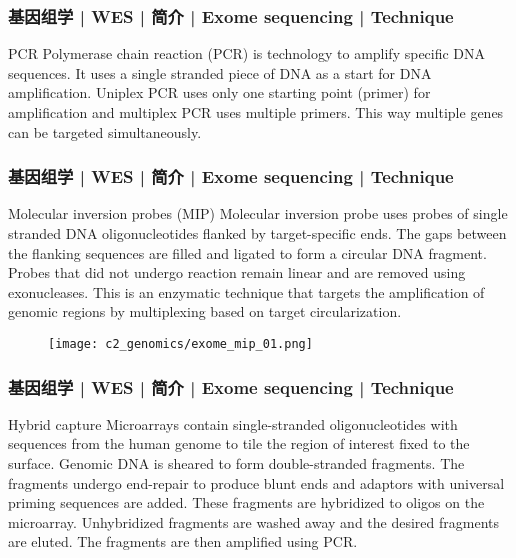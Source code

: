 \begin{frame}
  \frametitle{基因组学 | WES | 简介 | Exome sequencing | Technique}
  \begin{block}{PCR}
    Polymerase chain reaction (PCR) is technology to amplify specific DNA sequences. It uses a single stranded piece of DNA as a start for DNA amplification. Uniplex PCR uses only one starting point (primer) for amplification and multiplex PCR uses multiple primers. This way multiple genes can be targeted simultaneously.
  \end{block}
\end{frame}

\begin{frame}
  \frametitle{基因组学 | WES | 简介 | Exome sequencing | Technique}
  \begin{block}{Molecular inversion probes (MIP)}
    Molecular inversion probe uses probes of single stranded DNA oligonucleotides flanked by target-specific ends. The gaps between the flanking sequences are filled and ligated to form a circular DNA fragment. Probes that did not undergo reaction remain linear and are removed using exonucleases. This is an enzymatic technique that targets the amplification of genomic regions by multiplexing based on target circularization.
  \end{block}
  \begin{figure}
    \centering
    \texttt{[image: c2\_genomics/exome\_mip\_01.png]}
  \end{figure}
\end{frame}

\begin{frame}
  \frametitle{基因组学 | WES | 简介 | Exome sequencing | Technique}
  \begin{block}{Hybrid capture}
    Microarrays contain single-stranded oligonucleotides with sequences from the human genome to tile the region of interest fixed to the surface. Genomic DNA is sheared to form double-stranded fragments. The fragments undergo end-repair to produce blunt ends and adaptors with universal priming sequences are added. These fragments are hybridized to oligos on the microarray. Unhybridized fragments are washed away and the desired fragments are eluted. The fragments are then amplified using PCR.
  \end{block}
\end{frame}

